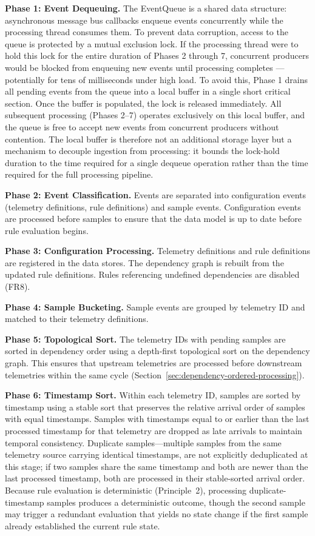\textbf{Phase 1: Event Dequeuing.} 
The EventQueue is a shared data structure: asynchronous message bus callbacks enqueue events concurrently while the processing thread consumes them. To prevent data corruption, access to the queue is protected by a mutual exclusion lock. If the processing thread were to hold this lock for the entire duration of Phases 2 through 7, concurrent producers would be blocked from enqueuing new events until processing completes — potentially for tens of milliseconds under high load. To avoid this, Phase 1 drains all pending events from the queue into a local buffer in a single short critical section. Once the buffer is populated, the lock is released immediately. All subsequent processing (Phases 2–7) operates exclusively on this local buffer, and the queue is free to accept new events from concurrent producers without contention. The local buffer is therefore not an additional storage layer but a mechanism to decouple ingestion from processing: it bounds the lock-hold duration to the time required for a single dequeue operation rather than the time required for the full processing pipeline.


\textbf{Phase 2: Event Classification.}  
Events are separated into configuration events (telemetry definitions, rule definitions) and sample events. Configuration events are processed before samples to ensure that the data model is up to date before rule evaluation begins.

\textbf{Phase 3: Configuration Processing.}  
Telemetry definitions and rule definitions are registered in the data stores. The dependency graph is rebuilt from the updated rule definitions. Rules referencing undefined dependencies are disabled (FR8).

\textbf{Phase 4: Sample Bucketing.}  
Sample events are grouped by telemetry ID and matched to their telemetry definitions.

\textbf{Phase 5: Topological Sort.}  
The telemetry IDs with pending samples are sorted in dependency order using a depth-first topological sort on the dependency graph. This ensures that upstream telemetries are processed before downstream telemetries within the same cycle (Section~\ref{sec:dependency-ordered-processing}).


\textbf{Phase 6: Timestamp Sort.}
Within each telemetry ID, samples are sorted by timestamp using a stable sort that preserves the relative arrival order of samples with equal timestamps. Samples with timestamps equal to or earlier than the last processed timestamp for that telemetry are dropped as late arrivals to maintain temporal consistency. Duplicate samples---multiple samples from the same telemetry source carrying identical timestamps, are not explicitly deduplicated at this stage; if two samples share the same timestamp and both are newer than the last processed timestamp, both are processed in their stable-sorted arrival order. Because rule evaluation is deterministic (Principle~2), processing duplicate-timestamp samples produces a deterministic outcome, though the second sample may trigger a redundant evaluation that yields no state change if the first sample already established the current rule state.


